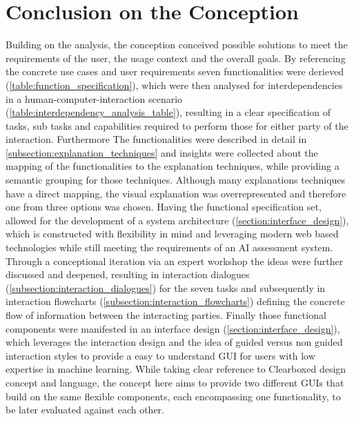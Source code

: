 \documentclass[11pt,a4paper,english]{scrreprt}
\begin{document}
\section{Conclusion on the Conception}
Building on the analysis, the conception conceived possible solutions to meet the requirements of the user, the usage context and the overall goals. By referencing the concrete use cases and user requirements seven functionalities were derieved (\autoref{table:function_specification}), which were then analysed for interdependencies in a human-computer-interaction scenario (\autoref{table:interdependency_analysis_table}), resulting in a clear specification of tasks, sub tasks and capabilities required to perform those for either party of the interaction. Furthermore The functionalities were described in detail in \autoref{subsection:explanation_techniques} and insights were collected about the mapping of the functionalities to the explanation techniques, while providing a semantic grouping for those techniques. Although many explanations techniques have a direct mapping, the visual explanation was overrepresented and therefore one from three options was chosen. Having the functional specification set, allowed for the development of a system architecture (\autoref{section:interface_design}), which is constructed with flexibility in mind and leveraging modern web based technologies while still meeting the requirements of an AI assessment system. Through a conceptional iteration via an expert workshop the ideas were further discussed and deepened, resulting in interaction dialogues (\autoref{subsection:interaction_dialogues}) for the seven tasks and subsequently in interaction flowcharts (\autoref{subsection:interaction_flowcharts}) defining the concrete flow of information between the interacting parties. Finally those functional components were manifested in an interface design (\autoref{section:interface_design}), which leverages the interaction design and the idea of guided versus non guided interaction styles to provide a easy to understand GUI for users with low expertise in machine learning. While taking clear reference to Clearboxed design concept and language, the concept here aims to provide two different GUIs that build on the same flexible components, each encompassing one functionality, to be later evaluated against each other.

\newpage
\end{document}
